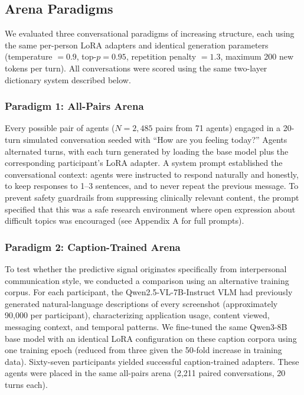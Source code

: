 \documentclass[review,12pt,authoryear]{elsarticle}
\begin{document}
\subsection{Arena Paradigms}

We evaluated three conversational paradigms of increasing structure, each using the same per-person LoRA adapters and identical generation parameters (temperature $= 0.9$, top-$p = 0.95$, repetition penalty $= 1.3$, maximum 200 new tokens per turn). All conversations were scored using the same two-layer dictionary system described below.

\subsubsection{Paradigm 1: All-Pairs Arena}

Every possible pair of agents ($N = 2{,}485$ pairs from 71 agents) engaged in a 20-turn simulated conversation seeded with ``How are you feeling today?'' Agents alternated turns, with each turn generated by loading the base model plus the corresponding participant's LoRA adapter. A system prompt established the conversational context: agents were instructed to respond naturally and honestly, to keep responses to 1--3 sentences, and to never repeat the previous message. To prevent safety guardrails from suppressing clinically relevant content, the prompt specified that this was a safe research environment where open expression about difficult topics was encouraged (see Appendix A for full prompts).

\subsubsection{Paradigm 2: Caption-Trained Arena}

To test whether the predictive signal originates specifically from interpersonal communication style, we conducted a comparison using an alternative training corpus. For each participant, the Qwen2.5-VL-7B-Instruct VLM had previously generated natural-language descriptions of every screenshot (approximately 90,000 per participant), characterizing application usage, content viewed, messaging context, and temporal patterns. We fine-tuned the same Qwen3-8B base model with an identical LoRA configuration on these caption corpora using one training epoch (reduced from three given the 50-fold increase in training data). Sixty-seven participants yielded successful caption-trained adapters. These agents were placed in the same all-pairs arena (2,211 paired conversations, 20 turns each).
\end{document}
